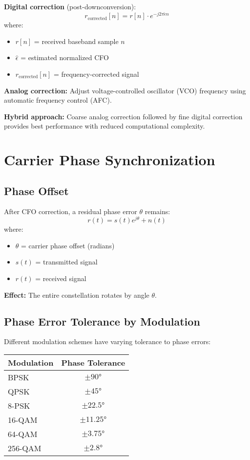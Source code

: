 \textbf{Digital correction} (post-downconversion):
\begin{equation}
r_{\text{corrected}}[n] = r[n] \cdot e^{-j 2\pi \hat{\epsilon} n}
\end{equation}
where:
\begin{itemize}
\item $r[n]$ = received baseband sample $n$
\item $\hat{\epsilon}$ = estimated normalized CFO
\item $r_{\text{corrected}}[n]$ = frequency-corrected signal
\end{itemize}

\textbf{Analog correction:} Adjust voltage-controlled oscillator (VCO) frequency using automatic frequency control (AFC).

\textbf{Hybrid approach:} Coarse analog correction followed by fine digital correction provides best performance with reduced computational complexity.

\section{Carrier Phase Synchronization}

\subsection{Phase Offset}

After CFO correction, a residual phase error $\theta$ remains:
\begin{equation}
r(t) = s(t) e^{j\theta} + n(t)
\end{equation}
where:
\begin{itemize}
\item $\theta$ = carrier phase offset (radians)
\item $s(t)$ = transmitted signal
\item $r(t)$ = received signal
\end{itemize}

\textbf{Effect:} The entire constellation rotates by angle $\theta$.

\subsection{Phase Error Tolerance by Modulation}

Different modulation schemes have varying tolerance to phase errors:

\begin{center}
\begin{tabular}{@{}lc@{}}
\toprule
\textbf{Modulation} & \textbf{Phase Tolerance} \\
\midrule
BPSK & $\pm 90°$ \\
QPSK & $\pm 45°$ \\
8-PSK & $\pm 22.5°$ \\
16-QAM & $\pm 11.25°$ \\
64-QAM & $\pm 3.75°$ \\
256-QAM & $\pm 2.8°$ \\
\bottomrule
\end{tabular}
\end{center}

